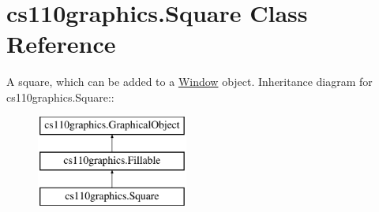 \hypertarget{classcs110graphics_1_1Square}{
\section{cs110graphics.Square Class Reference}
\label{classcs110graphics_1_1Square}
}


A square, which can be added to a \hyperlink{classcs110graphics_1_1Window}{Window} object.  
Inheritance diagram for cs110graphics.Square::\begin{figure}[H]
\begin{center}
\leavevmode
\includegraphics[height=3cm]{classcs110graphics_1_1Square}
\end{center}
\end{figure}
